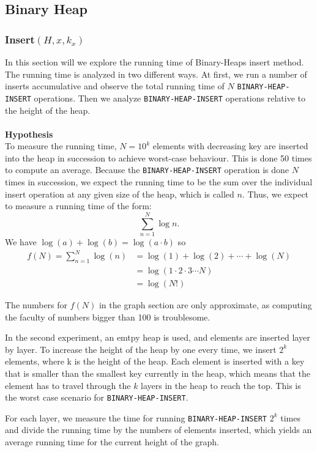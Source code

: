 \documentclass[a4paper,10pt]{article}
\begin{document}
\subsection{Binary Heap}
\subsubsection{Insert$(H,x,k_x)$}
In this section will we explore the running time of Binary-Heaps insert method. The running time is analyzed in two different ways. At first, we run a number of inserts accumulative and observe the total running time of $N$ \texttt{BINARY-HEAP-INSERT} operations. Then we analyze \texttt{BINARY-HEAP-INSERT} operations relative to the height of the heap.\\\\
{\bf Hypothesis}\\
To measure the running time, $N=10^k$ elements with decreasing key are inserted into the heap in succession to achieve worst-case behaviour. This is done 50 times to compute an average. Because the \texttt{BINARY-HEAP-INSERT} operation is done $N$ times in succession, we expect the running time to be the sum over the individual insert operation at any given size of the heap, which is called $n$.
Thus, we expect to measure a running time of the form: \[\sum^N_{n=1}\log n.\]
We have $\log(a)+\log(b)=\log(a\cdot b)$ so 
\begin{align*}
  f(N)=\sum^N_{n=1}\log(n)&=\log(1)+\log(2)+\cdots+\log(N)\\
  &=\log(1\cdot2\cdot3\cdots N)\\
  &=\log(N!)
\end{align*}

The numbers for $f(N)$ in the graph section are only approximate, as computing the faculty of numbers bigger than 100 is troublesome. 

In the second experiment, an emtpy heap is used, and elements are inserted layer by layer. To increase the height of the heap by one every time, we insert $2^k$ elements, where k is the height of the heap. Each element is inserted with a key that is smaller than the smallest key currently in the heap, which means that the element has to travel through the $k$ layers in the heap to reach the top. This is the worst case scenario for \texttt{BINARY-HEAP-INSERT}.

For each layer, we measure the time for running \texttt{BINARY-HEAP-INSERT} $2^k$ times and divide the running time by the numbers of elements inserted, which yields an average running time for the current height of the graph.
\end{document}
